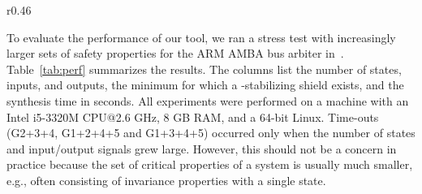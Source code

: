 \documentclass{llncs}
\begin{document}
\begin{wraptable}[10]{r}{0.46\textwidth}
\centering
\setlength{\tabcolsep}{5pt}
\vspace{-5ex}
\caption{Performance for AMBA~\cite{BloemJPPS12}.}
\vspace{-0.3cm}
\label{tab:perf}
\end{wraptable}
To evaluate the performance of our tool, we ran a stress test with 
increasingly larger sets of safety properties for the ARM AMBA bus 
arbiter in~\cite{BloemJPPS12}.  Table~\ref{tab:perf} summarizes the 
results.  The columns list the number of states, inputs, and outputs, 
the minimum  for which a -stabilizing shield exists, and the 
synthesis time in seconds.  All experiments were performed on a machine 
with an Intel i5-3320M CPU@2.6 GHz, 8 GB RAM, and a 64-bit Linux.  
Time-outs (G2+3+4, G1+2+4+5 and G1+3+4+5) occurred only when the number 
of states and input/output signals grew large.  However, this should not 
be a concern in practice because the set of critical properties of a 
system is usually much smaller, e.g., often consisting of invariance 
properties with a single state.  
\end{document}
